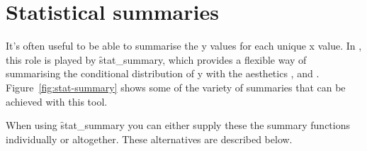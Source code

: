 % 
%

\section{Statistical summaries}
\label{sec:summary}

It's often useful to be able to summarise the y values for each unique x value.  In \ggplot, this role is played by \f{stat_summary}, which provides a flexible way of summarising the conditional distribution of y with the aesthetics  ,  and .  Figure~\ref{fig:stat-summary} shows some of the variety of summaries that can be achieved with this tool.

When using \f{stat_summary} you can either supply these the summary functions individually or altogether.  These alternatives are described below.  

% 


